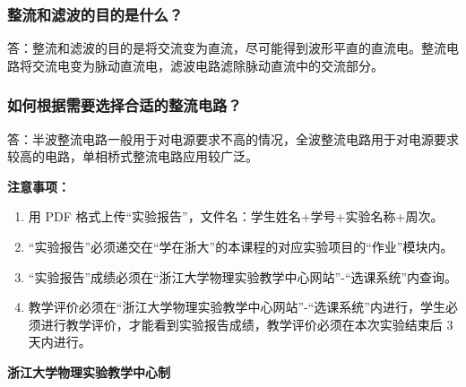 \documentclass[10pt,a4paper]{ctexart}
\newcommand{\sihao}{\fontsize{14pt}{18pt}\selectfont}
\newcommand{\xiaosi}{\fontsize{12pt}{16pt}\selectfont}
\begin{document}
    
    \subsubsection*{整流和滤波的目的是什么？}
    
    答：整流和滤波的目的是将交流变为直流，尽可能得到波形平直的直流电。整流电路将交流电变为脉动直流电，滤波电路滤除脉动直流中的交流部分。    

    \subsubsection*{如何根据需要选择合适的整流电路？}

    答：半波整流电路一般用于对电源要求不高的情况，全波整流电路用于对电源要求较高的电路，单相桥式整流电路应用较广泛。
    
\newpage

\sihao\textbf{注意事项：}
\xiaosi
\begin{enumerate}
    \item  用 PDF 格式上传“实验报告”，文件名：学生姓名+学号+实验名称+周次。
    \item  “实验报告”必须递交在“学在浙大”的本课程的对应实验项目的“作业”模块内。
    \item  “实验报告”成绩必须在“浙江大学物理实验教学中心网站”-“选课系统”内查询。
    \item 教学评价必须在“浙江大学物理实验教学中心网站”-“选课系统”内进行，学生必须进行教学评价，才能看到实验报告成绩，教学评价必须在本次实验结束后 3 天内进行。
\end{enumerate}

\vspace{1cm}
\xiaosi\centering \textbf{浙江大学物理实验教学中心制}
\end{document}
